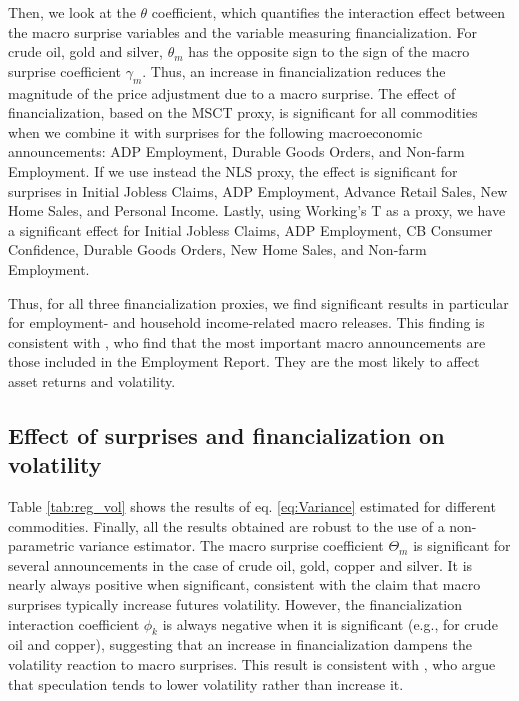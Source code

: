 \documentclass[12pt]{article}
\begin{document}
Then, we look at the $\theta$ coefficient, which quantifies the interaction effect between the macro surprise variables and the variable measuring financialization. For crude oil, gold and silver, $\theta_m$ has the opposite sign to the sign of the macro surprise coefficient $\gamma_m$. Thus, an increase in financialization reduces the magnitude of the price adjustment due to a macro surprise. The effect of financialization, based on the MSCT proxy, is significant for all commodities when we combine it with surprises for the following macroeconomic announcements: ADP Employment, Durable Goods Orders, and Non-farm Employment. If we use instead the NLS proxy, the effect is significant for surprises in Initial Jobless Claims, ADP Employment, Advance Retail Sales, New Home Sales, and Personal Income. Lastly, using Working's T as a proxy, we have a significant effect for Initial Jobless Claims, ADP Employment, CB Consumer Confidence, Durable Goods Orders, New Home Sales, and Non-farm Employment. 

Thus, for all three financialization proxies, we find significant results in particular for employment- and household income-related macro releases. This finding is consistent with \citet{hordahl2015expectations}, who find that the most important macro announcements are those included in the Employment Report. They are the most likely to affect asset returns and volatility.
  
	\subsection{Effect of surprises and financialization on volatility}
	
	Table \ref{tab:reg_vol} shows the results of eq. \eqref{eq:Variance} estimated for different commodities.  Finally, all the results obtained are robust to the use of a non-parametric variance estimator.  The macro surprise coefficient $\Theta_m$ is significant for several announcements in the case of crude oil, gold, copper and silver. It is nearly always positive when significant, consistent with the claim that macro surprises typically increase futures volatility. However, the financialization interaction coefficient $\phi_k$ is always negative when it is significant (e.g., for crude oil and copper), suggesting that an increase in financialization dampens the volatility reaction to macro surprises. This result is consistent with \citet{brunetti2016speculators}, who argue that speculation tends to lower volatility rather than increase it. 
\end{document}
